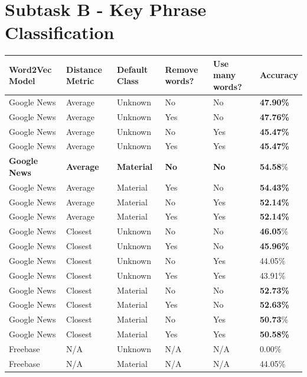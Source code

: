 \section{Subtask B - Key Phrase Classification}

\begin{table}
	\centering
	\begin{tabular}{ C{2.5cm} | C{2cm} | C{2cm} | C{2cm} | C{2cm} | C{2cm} }
		\textbf{Word2Vec Model} & \textbf{Distance Metric} & \textbf{Default Class} & \textbf{Remove words?} & \textbf{Use many words?} & \textbf{Accuracy} \\
		\hline
		Google News & Average & Unknown & No & No & \textbf{47.90\%} \\
		Google News & Average & Unknown & Yes & No & \textbf{47.76\%} \\
		Google News & Average & Unknown & No & Yes & \textbf{45.47\%} \\
		Google News & Average & Unknown & Yes & Yes & \textbf{45.47\%} \\
		\textbf{Google News} & \textbf{Average} & \textbf{Material} & \textbf{No} & \textbf{No} & \textbf{54.58}\% \\
		Google News & Average & Material & Yes & No & \textbf{54.43\%} \\
		Google News & Average & Material & No & Yes & \textbf{52.14\%} \\
		Google News & Average & Material & Yes & Yes  & \textbf{52.14\%} \\
		Google News & Closest & Unknown & No & No & \textbf{46.05}\% \\
		Google News & Closest & Unknown & Yes & No & \textbf{45.96\%} \\
		Google News & Closest & Unknown & No & Yes & 44.05\% \\
		Google News & Closest & Unknown & Yes & Yes & 43.91\% \\
		Google News & Closest & Material & No & No & \textbf{52.73\%} \\
		Google News & Closest & Material & Yes & No & \textbf{52.63\%} \\
		Google News & Closest & Material & No & Yes & \textbf{50.73}\% \\
		Google News & Closest & Material & Yes & Yes & \textbf{50.58\%} \\
		Freebase & N/A & Unknown & N/A & N/A & 0.00\% \\
		Freebase & N/A & Material & N/A & N/A & 44.05\% \\
	\end{tabular}

\end{table}
